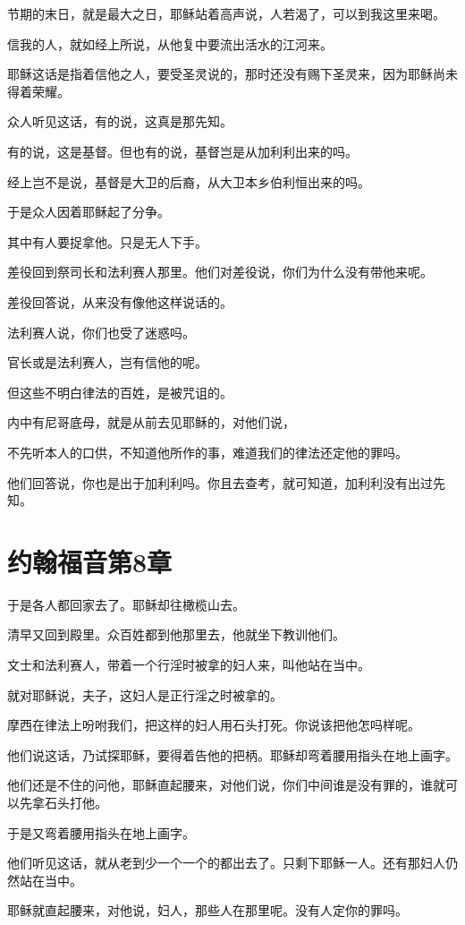 \documentclass[12pt,oneside]{book}
\begin{document}
节期的末日，就是最大之日，耶稣站着高声说，人若渴了，可以到我这里来喝。

信我的人，就如经上所说，从他复中要流出活水的江河来。

耶稣这话是指着信他之人，要受圣灵说的，那时还没有赐下圣灵来，因为耶稣尚未得着荣耀。

众人听见这话，有的说，这真是那先知。

有的说，这是基督。但也有的说，基督岂是从加利利出来的吗。

经上岂不是说，基督是大卫的后裔，从大卫本乡伯利恒出来的吗。

于是众人因着耶稣起了分争。

其中有人要捉拿他。只是无人下手。

差役回到祭司长和法利赛人那里。他们对差役说，你们为什么没有带他来呢。

差役回答说，从来没有像他这样说话的。

法利赛人说，你们也受了迷惑吗。

官长或是法利赛人，岂有信他的呢。

但这些不明白律法的百姓，是被咒诅的。

内中有尼哥底母，就是从前去见耶稣的，对他们说，

不先听本人的口供，不知道他所作的事，难道我们的律法还定他的罪吗。

他们回答说，你也是出于加利利吗。你且去查考，就可知道，加利利没有出过先知。

\chapter{约翰福音第8章}
于是各人都回家去了。耶稣却往橄榄山去。

清早又回到殿里。众百姓都到他那里去，他就坐下教训他们。

文士和法利赛人，带着一个行淫时被拿的妇人来，叫他站在当中。

就对耶稣说，夫子，这妇人是正行淫之时被拿的。

摩西在律法上吩咐我们，把这样的妇人用石头打死。你说该把他怎吗样呢。

他们说这话，乃试探耶稣，要得着告他的把柄。耶稣却弯着腰用指头在地上画字。

他们还是不住的问他，耶稣直起腰来，对他们说，你们中间谁是没有罪的，谁就可以先拿石头打他。

于是又弯着腰用指头在地上画字。

他们听见这话，就从老到少一个一个的都出去了。只剩下耶稣一人。还有那妇人仍然站在当中。

耶稣就直起腰来，对他说，妇人，那些人在那里呢。没有人定你的罪吗。
\end{document}
